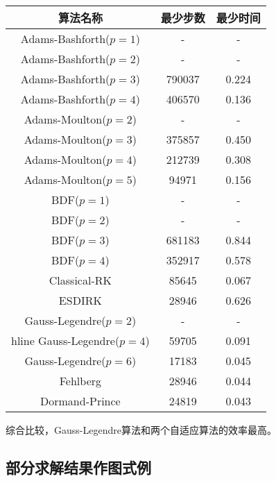 \documentclass[lang=cn,a4paper,newtx,bibend=bibtex]{elegantpaper}
\begin{document}
\begin{longtable}{c|c|c|}
    算法名称 & 最少步数 & 最少时间 \\ \hline
    Adams-Bashforth($p=1$) & - & - \\ \hline
    Adams-Bashforth($p=2$) & - & - \\ \hline
    Adams-Bashforth($p=3$) & 790037 & 0.224 \\ \hline
    Adams-Bashforth($p=4$) & 406570 & 0.136 \\ \hline
    Adams-Moulton($p=2$) & - & - \\ \hline
    Adams-Moulton($p=3$) & 375857 & 0.450 \\ \hline
    Adams-Moulton($p=4$) & 212739 & 0.308 \\ \hline
    Adams-Moulton($p=5$) & 94971 & 0.156 \\ \hline
    BDF($p=1$) & - & - \\ \hline
    BDF($p=2$) & - & - \\ \hline
    BDF($p=3$) & 681183 & 0.844 \\ \hline
    BDF($p=4$) & 352917 & 0.578 \\ \hline
    Classical-RK & 85645 & 0.067 \\ \hline
    ESDIRK & 28946 & 0.626 \\ \hline
    Gauss-Legendre($p=2$) & - & - \\ hline
    Gauss-Legendre($p=4$) & 59705 & 0.091 \\ \hline
    Gauss-Legendre($p=6$) & 17183 & 0.045 \\ \hline
    Fehlberg & 28946 & 0.044 \\ \hline
    Dormand-Prince & 24819 & 0.043 \\ \hline
\end{longtable}

综合比较，Gauss-Legendre算法和两个自适应算法的效率最高。

\subsection{部分求解结果作图式例}
\end{document}
